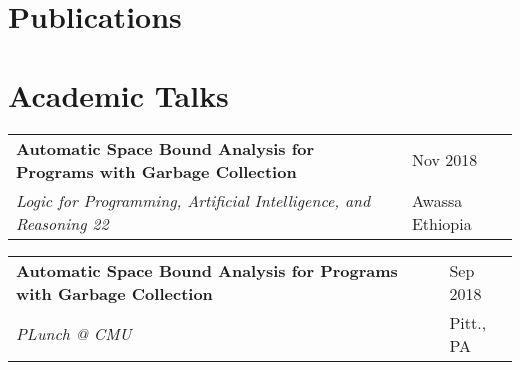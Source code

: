 \documentclass[12pt]{article}
\begin{document}
\fi
% 

\section{Publications}


\nocite{*}

\section{Academic Talks}
\begin{tabu}{@{}l X[l]}
  \textbf{Automatic Space Bound Analysis for Programs with Garbage Collection} & Nov 2018\\
  \emph{Logic for Programming, Artificial Intelligence, and Reasoning 22} & Awassa Ethiopia
\end{tabu}

\begin{tabu}{@{}l X[l]}
  \textbf{Automatic Space Bound Analysis for Programs with Garbage Collection} & Sep 2018\\
\emph{PLunch @ CMU} & Pitt., PA
\end{tabu}
\end{document}

